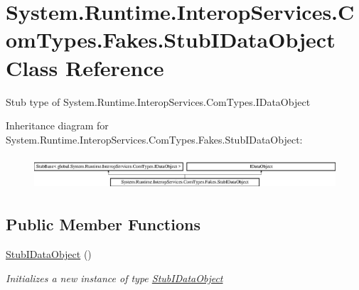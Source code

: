 \hypertarget{class_system_1_1_runtime_1_1_interop_services_1_1_com_types_1_1_fakes_1_1_stub_i_data_object}{\section{System.\-Runtime.\-Interop\-Services.\-Com\-Types.\-Fakes.\-Stub\-I\-Data\-Object Class Reference}
\label{class_system_1_1_runtime_1_1_interop_services_1_1_com_types_1_1_fakes_1_1_stub_i_data_object}
}


Stub type of System.\-Runtime.\-Interop\-Services.\-Com\-Types.\-I\-Data\-Object 


Inheritance diagram for System.\-Runtime.\-Interop\-Services.\-Com\-Types.\-Fakes.\-Stub\-I\-Data\-Object\-:\begin{figure}[H]
\begin{center}
\leavevmode
\includegraphics[height=1.247216cm]{class_system_1_1_runtime_1_1_interop_services_1_1_com_types_1_1_fakes_1_1_stub_i_data_object}
\end{center}
\end{figure}
\subsection*{Public Member Functions}
\begin{DoxyCompactItemize}
\item 
\hyperlink{class_system_1_1_runtime_1_1_interop_services_1_1_com_types_1_1_fakes_1_1_stub_i_data_object_a4a58ee1bbd58819f7b7f6fb5f3e4079e}{Stub\-I\-Data\-Object} ()
\begin{DoxyCompactList}\small\item\em Initializes a new instance of type \hyperlink{class_system_1_1_runtime_1_1_interop_services_1_1_com_types_1_1_fakes_1_1_stub_i_data_object}{Stub\-I\-Data\-Object}\end{DoxyCompactList}\end{DoxyCompactItemize}
